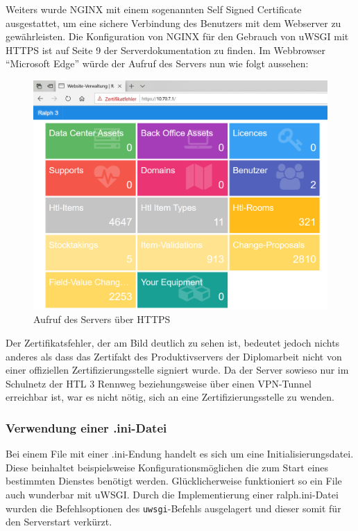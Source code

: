 \documentclass[
]{article}
\begin{document}
Weiters wurde NGINX mit einem sogenannten Self Signed Certificate
ausgestattet, um eine sichere Verbindung des Benutzers mit dem Webserver
zu gewährleisten. Die Konfiguration von NGINX für den Gebrauch von uWSGI
mit HTTPS ist auf Seite 9 der Serverdokumentation zu finden. Im
Webbrowser ``Microsoft Edge'' würde der Aufruf des Servers nun wie folgt
aussehen:

\begin{figure}[ht]
\centering
\includegraphics{https.png}
\caption{Aufruf des Servers über HTTPS}
\end{figure}

Der Zertifikatsfehler, der am Bild deutlich zu sehen ist, bedeutet
jedoch nichts anderes als dass das Zertifakt des Produktivservers der
Diplomarbeit nicht von einer offiziellen Zertifizierungsstelle signiert
wurde. Da der Server sowieso nur im Schulnetz der HTL 3 Rennweg
beziehungsweise über einen VPN-Tunnel erreichbar ist, war es nicht
nötig, sich an eine Zertifizierungsstelle zu wenden.

\hypertarget{verwendung-einer-.ini-datei}{%
\subsubsection{Verwendung einer
.ini-Datei}\label{verwendung-einer-.ini-datei}}

Bei einem File mit einer .ini-Endung handelt es sich um eine
Initialisierungsdatei. Diese beinhaltet beispielsweise
Konfigurationsmöglichen die zum Start eines bestimmten Dienstes benötigt
werden. Glücklicherweise funktioniert so ein File auch wunderbar mit
uWSGI. Durch die Implementierung einer ralph.ini-Datei wurden die
Befehlsoptionen des \texttt{uwsgi}-Befehls ausgelagert und dieser somit
für den Serverstart verkürzt.
\end{document}
